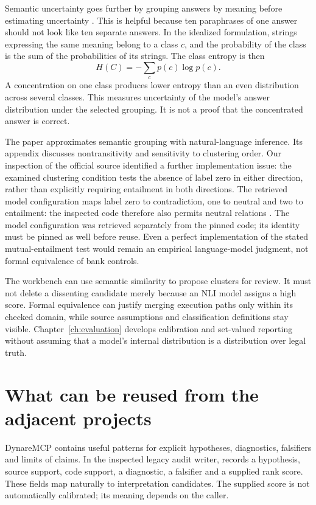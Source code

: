 \documentclass[12pt,a4paper,oneside,openany]{book}
\newcommand{\srcpath}[1]{\path{#1}}
\begin{document}
Semantic uncertainty goes further by grouping answers by meaning before
estimating uncertainty \citep[sections 3--4]{semantic2023}. This is helpful because
ten paraphrases of one answer should not look like ten separate answers. In the
idealized formulation, strings expressing the same meaning belong to a class
$c$, and the probability of the class is the sum of the probabilities of its
strings. The class entropy is then
\begin{equation}
 H(C)=-\sum_c p(c)\log p(c).
 \label{eq:semantic-entropy}
\end{equation}
A concentration on one class produces lower entropy than an even distribution
across several classes. This measures uncertainty of the model's answer
distribution under the selected grouping. It is not a proof that the concentrated
answer is correct.

The paper approximates semantic grouping with natural-language inference. Its
appendix discusses nontransitivity and sensitivity to clustering order. Our
inspection of the official source identified a further implementation issue: the
examined clustering condition tests the absence of label zero in either direction,
rather than explicitly requiring entailment in both directions. The retrieved model configuration maps label zero to contradiction, one to
neutral and two to entailment: the inspected code therefore also permits neutral
relations \citep{semanticcode2023,debertaconfig}. The model configuration was retrieved separately from the pinned code;
its identity must be pinned as well before reuse. Even a
perfect implementation of the stated mutual-entailment test would remain an
empirical language-model judgment, not formal equivalence of bank controls.

The workbench can use semantic similarity to propose clusters for review. It
must not delete a dissenting candidate merely because an NLI model assigns a
high score. Formal equivalence can justify merging execution paths only within
its checked domain, while source assumptions and classification definitions stay
visible. Chapter~\ref{ch:evaluation} develops calibration and set-valued reporting
without assuming that a model's internal distribution is a distribution over
legal truth.

\section{What can be reused from the adjacent projects}

DynareMCP contains useful patterns for explicit hypotheses, diagnostics,
falsifiers and limits of claims. In the inspected legacy audit writer,
\srcpath{write_hypothesis_node} records a hypothesis, source support, code support,
a diagnostic, a falsifier and a supplied rank score. These fields map naturally
to interpretation candidates. The supplied score is not automatically calibrated;
its meaning depends on the caller.
\end{document}
